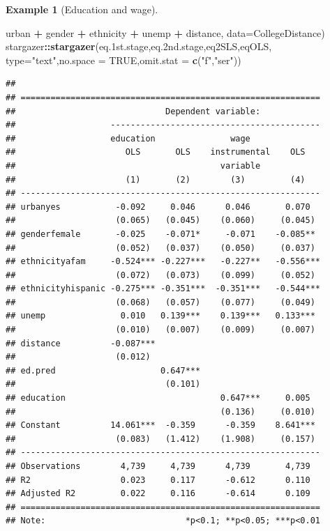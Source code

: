 \documentclass[
  12pt,
]{book}
\newenvironment{Shaded}{\begin{snugshade}}{\end{snugshade}}
\newcommand{\AttributeTok}[1]{\textcolor[rgb]{0.13,0.29,0.53}{#1}}
\newcommand{\ConstantTok}[1]{\textcolor[rgb]{0.56,0.35,0.01}{#1}}
\newcommand{\FloatTok}[1]{\textcolor[rgb]{0.00,0.00,0.81}{#1}}
\newcommand{\FunctionTok}[1]{\textcolor[rgb]{0.13,0.29,0.53}{\textbf{#1}}}
\newcommand{\NormalTok}[1]{#1}
\newcommand{\SpecialCharTok}[1]{\textcolor[rgb]{0.81,0.36,0.00}{\textbf{#1}}}
\newcommand{\StringTok}[1]{\textcolor[rgb]{0.31,0.60,0.02}{#1}}
\theoremstyle{definition}
\theoremstyle{definition}
\newtheorem{example}{Example}[chapter]
\theoremstyle{definition}
\theoremstyle{definition}
\theoremstyle{remark}
\begin{document}
\begin{example}[Education and wage]
\begin{Shaded}
\begin{Highlighting}[]
\NormalTok{                  urban }\SpecialCharTok{+}\NormalTok{ gender }\SpecialCharTok{+}\NormalTok{ ethnicity }\SpecialCharTok{+}\NormalTok{ unemp }\SpecialCharTok{+}\NormalTok{ distance,}
                \AttributeTok{data=}\NormalTok{CollegeDistance)}
\NormalTok{stargazer}\SpecialCharTok{::}\FunctionTok{stargazer}\NormalTok{(eq}\FloatTok{.1}\NormalTok{st.stage,eq}\FloatTok{.2}\NormalTok{nd.stage,eq2SLS,eqOLS,}
                     \AttributeTok{type=}\StringTok{"text"}\NormalTok{,}\AttributeTok{no.space =} \ConstantTok{TRUE}\NormalTok{,}\AttributeTok{omit.stat =} \FunctionTok{c}\NormalTok{(}\StringTok{"f"}\NormalTok{,}\StringTok{"ser"}\NormalTok{))}
\end{Highlighting}
\end{Shaded}

\begin{verbatim}
## 
## ============================================================
##                              Dependent variable:            
##                   ------------------------------------------
##                   education               wage              
##                      OLS       OLS    instrumental    OLS   
##                                         variable            
##                      (1)       (2)        (3)         (4)   
## ------------------------------------------------------------
## urbanyes           -0.092     0.046      0.046       0.070  
##                    (0.065)   (0.045)    (0.060)     (0.045) 
## genderfemale       -0.025    -0.071*     -0.071    -0.085** 
##                    (0.052)   (0.037)    (0.050)     (0.037) 
## ethnicityafam     -0.524*** -0.227***   -0.227**   -0.556***
##                    (0.072)   (0.073)    (0.099)     (0.052) 
## ethnicityhispanic -0.275*** -0.351***  -0.351***   -0.544***
##                    (0.068)   (0.057)    (0.077)     (0.049) 
## unemp               0.010   0.139***    0.139***   0.133*** 
##                    (0.010)   (0.007)    (0.009)     (0.007) 
## distance          -0.087***                                 
##                    (0.012)                                  
## ed.pred                     0.647***                        
##                              (0.101)                        
## education                               0.647***     0.005  
##                                         (0.136)     (0.010) 
## Constant          14.061***  -0.359      -0.359    8.641*** 
##                    (0.083)   (1.412)    (1.908)     (0.157) 
## ------------------------------------------------------------
## Observations        4,739     4,739      4,739       4,739  
## R2                  0.023     0.117      -0.612      0.110  
## Adjusted R2         0.022     0.116      -0.614      0.109  
## ============================================================
## Note:                            *p<0.1; **p<0.05; ***p<0.01
\end{verbatim}

\end{example}
\end{document}

